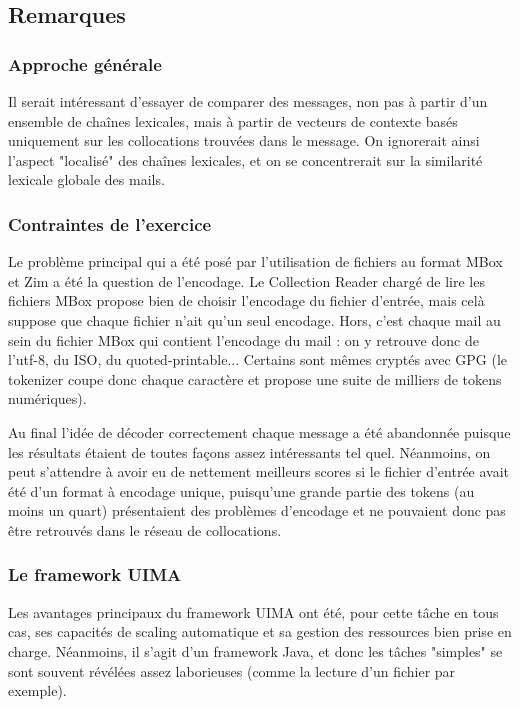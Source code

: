 \documentclass[a4paper]{article}
\begin{document}
\subsection{Remarques}

\subsubsection{Approche générale}

Il serait intéressant d'essayer de comparer des messages, non pas à partir d'un ensemble de chaînes lexicales, mais à partir de vecteurs de contexte basés uniquement sur les collocations trouvées dans le message. On ignorerait ainsi l'aspect "localisé" des chaînes lexicales, et on se concentrerait sur la similarité lexicale globale des mails.

\subsubsection{Contraintes de l'exercice}

Le problème principal qui a été posé par l'utilisation de fichiers au format MBox et Zim a été la question de l'encodage. Le Collection Reader chargé de lire les fichiers MBox propose bien de choisir l'encodage du fichier d'entrée, mais celà suppose que chaque fichier n'ait qu'un seul encodage. Hors, c'est chaque mail au sein du fichier MBox qui contient l'encodage du mail : on y retrouve donc de l'utf-8, du ISO, du quoted-printable... Certains sont mêmes cryptés avec GPG (le tokenizer coupe donc chaque caractère et propose une suite de milliers de tokens numériques).\newline

Au final l'idée de décoder correctement chaque message a été abandonnée puisque les résultats étaient de toutes façons assez intéressants tel quel. Néanmoins, on peut s'attendre à avoir eu de nettement meilleurs scores si le fichier d'entrée avait été d'un format à encodage unique, puisqu'une grande partie des tokens (au moins un quart) présentaient des problèmes d'encodage et ne pouvaient donc pas être retrouvés dans le réseau de collocations.

\subsubsection{Le framework UIMA}

Les avantages principaux du framework UIMA ont été, pour cette tâche en tous cas, ses capacités de scaling automatique et sa gestion des ressources bien prise en charge. Néanmoins, il s'agit d'un framework Java, et donc les tâches "simples" se sont souvent révélées assez laborieuses (comme la lecture d'un fichier par exemple).
\end{document}

